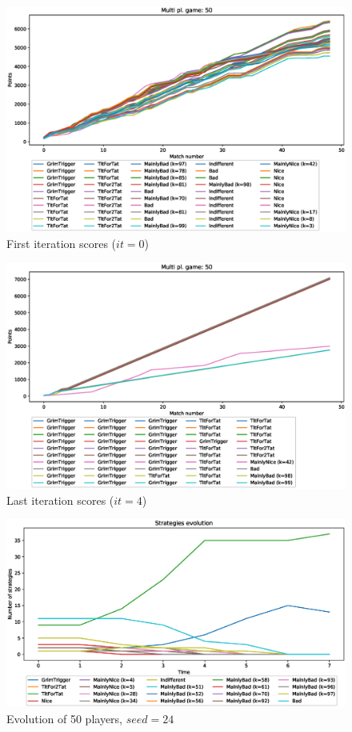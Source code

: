 \documentclass[journal,10pt,twoside]{IEEEtran}
\begin{document}
\begin{figure}[!ht]
    \centering
    \includegraphics[width=1\columnwidth]{../img/ripdmp-const/ripdmp-scores-const-pop-50-r0}
    \caption{First iteration scores ($it=0$)}
    \label{fig:constFI}
\end{figure}

\begin{figure}[!ht]
    \centering
    \includegraphics[width=1\columnwidth]{../img/ripdmp-const/ripdmp-scores-const-pop-50-r3}
    \caption{Last iteration scores ($it=4$)}
    \label{fig:constLI}
\end{figure}

\begin{figure}[!ht]
    \centering
    \includegraphics[width=1\columnwidth]{../img/ripdmp-const/seed24/ripdmp-evolution-const-pop-50}
    \caption{Evolution of 50 players, $seed = 24$}
    \label{fig:constRseed24}
\end{figure}
\end{document}
